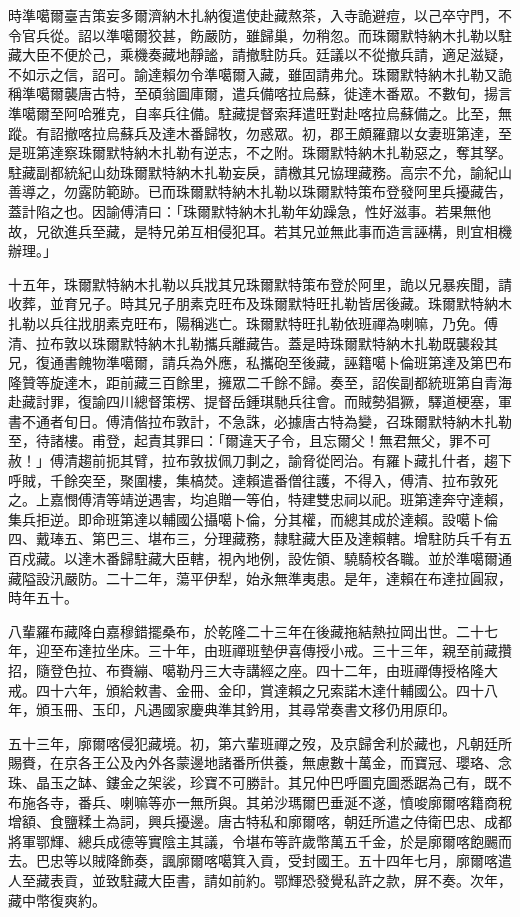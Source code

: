 \begin{pinyinscope}
時準噶爾臺吉策妄多爾濟納木扎納復遣使赴藏熬茶，入寺詭避痘，以己卒守門，不令官兵從。詔以準噶爾狡甚，飭嚴防，雖歸巢，勿稍忽。而珠爾默特納木扎勒以駐藏大臣不便於己，乘機奏藏地靜謐，請撤駐防兵。廷議以不從撤兵請，適足滋疑，不如示之信，詔可。諭達賴勿令準噶爾入藏，雖固請弗允。珠爾默特納木扎勒又詭稱準噶爾襲唐古特，至碩翁圖庫爾，遣兵備喀拉烏蘇，徙達木番眾。不數旬，揚言準噶爾至阿哈雅克，自率兵往備。駐藏提督索拜遣旺對赴喀拉烏蘇備之。比至，無蹤。有詔撤喀拉烏蘇兵及達木番歸牧，勿惑眾。初，郡王頗羅鼐以女妻班第達，至是班第達察珠爾默特納木扎勒有逆志，不之附。珠爾默特納木扎勒惡之，奪其孥。駐藏副都統紀山劾珠爾默特納木扎勒妄戾，請檄其兄協理藏務。高宗不允，諭紀山善導之，勿露防範跡。已而珠爾默特納木扎勒以珠爾默特策布登發阿里兵擾藏告，蓋計陷之也。因諭傅清曰：「珠爾默特納木扎勒年幼躁急，性好滋事。若果無他故，兄欲進兵至藏，是特兄弟互相侵犯耳。若其兄並無此事而造言誣構，則宜相機辦理。」

十五年，珠爾默特納木扎勒以兵戕其兄珠爾默特策布登於阿里，詭以兄暴疾聞，請收葬，並育兄子。時其兄子朋素克旺布及珠爾默特旺扎勒皆居後藏。珠爾默特納木扎勒以兵往戕朋素克旺布，陽稱逃亡。珠爾默特旺扎勒依班禪為喇嘛，乃免。傅清、拉布敦以珠爾默特納木扎勒攜兵離藏告。蓋是時珠爾默特納木扎勒既襲殺其兄，復通書餽物準噶爾，請兵為外應，私攜砲至後藏，誣籍噶卜倫班第達及第巴布隆贊等旋達木，距前藏三百餘里，擁眾二千餘不歸。奏至，詔俟副都統班第自青海赴藏討罪，復諭四川總督策楞、提督岳鍾琪馳兵往會。而賊勢猖獗，驛道梗塞，軍書不通者旬日。傅清偕拉布敦計，不急誅，必據唐古特為變，召珠爾默特納木扎勒至，待諸樓。甫登，起責其罪曰：「爾違天子令，且忘爾父！無君無父，罪不可赦！」傅清趨前扼其臂，拉布敦拔佩刀剚之，諭脅從罔治。有羅卜藏扎什者，趨下呼賊，千餘突至，聚圍樓，集槁焚。達賴遣番僧往護，不得入，傅清、拉布敦死之。上嘉憫傅清等靖逆遇害，均追贈一等伯，特建雙忠祠以祀。班第達奔守達賴，集兵拒逆。即命班第達以輔國公攝噶卜倫，分其權，而總其成於達賴。設噶卜倫四、戴琫五、第巴三、堪布三，分理藏務，隸駐藏大臣及達賴轄。增駐防兵千有五百戍藏。以達木番歸駐藏大臣轄，視內地例，設佐領、驍騎校各職。並於準噶爾通藏隘設汛嚴防。二十二年，蕩平伊犁，始永無準夷患。是年，達賴在布達拉圓寂，時年五十。

八輩羅布藏降白嘉穆錯擺桑布，於乾隆二十三年在後藏拖結熱拉岡出世。二十七年，迎至布達拉坐床。三十年，由班禪班墊伊喜傳授小戒。三十三年，親至前藏攢招，隨登色拉、布賚繃、噶勒丹三大寺講經之座。四十二年，由班禪傳授格隆大戒。四十六年，頒給敕書、金冊、金印，賞達賴之兄索諾木達什輔國公。四十八年，頒玉冊、玉印，凡遇國家慶典準其鈐用，其尋常奏書文移仍用原印。

五十三年，廓爾喀侵犯藏境。初，第六輩班禪之歿，及京歸舍利於藏也，凡朝廷所賜賚，在京各王公及內外各蒙邊地諸番所供養，無慮數十萬金，而寶冠、瓔珞、念珠、晶玉之缽、鏤金之架裟，珍寶不可勝計。其兄仲巴呼圖克圖悉踞為己有，既不布施各寺，番兵、喇嘛等亦一無所與。其弟沙瑪爾巴垂涎不遂，憤唆廓爾喀籍商稅增額、食鹽糅土為詞，興兵擾邊。唐古特私和廓爾喀，朝廷所遣之侍衛巴忠、成都將軍鄂輝、總兵成德等實陰主其議，令堪布等許歲幣萬五千金，於是廓爾喀飽颺而去。巴忠等以賊降飾奏，諷廓爾喀噶箕入貢，受封國王。五十四年七月，廓爾喀遣人至藏表貢，並致駐藏大臣書，請如前約。鄂輝恐發覺私許之款，屏不奏。次年，藏中幣復爽約。


\end{pinyinscope}
